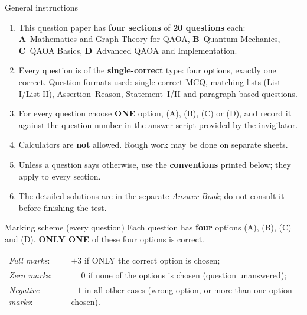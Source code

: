 \documentclass[11pt,a4paper]{article}
\begin{document}
\vspace{6pt}
\begin{infobox}{General instructions}
\begin{enumerate}[leftmargin=1.4em, itemsep=1pt, topsep=1pt]
\item This question paper has \textbf{four sections} of \textbf{20 questions} each:
\textbf{A}~Mathematics and Graph Theory for QAOA, \textbf{B}~Quantum Mechanics, \textbf{C}~QAOA Basics, \textbf{D}~Advanced QAOA and Implementation.
\item Every question is of the \textbf{single-correct} type: four options, exactly one correct. Question formats used:
single-correct MCQ, matching lists (List-I/List-II), Assertion--Reason, Statement~I/II and paragraph-based questions.
\item For every question choose \textbf{ONE} option, (A), (B), (C) or (D), and record it against the question number in the answer script provided by the invigilator.
\item Calculators are \textbf{not} allowed. Rough work may be done on separate sheets.
\item Unless a question says otherwise, use the \textbf{conventions} printed below; they apply to every section.
\item The detailed solutions are in the separate \emph{Answer Book}; do not consult it before finishing the test.
\end{enumerate}
\end{infobox}
\begin{infobox}{Marking scheme (every question)}
Each question has \textbf{four} options (A), (B), (C) and (D). \textbf{ONLY ONE} of these four options is correct.\\[2pt]
\begin{tabular}{@{}ll@{}}
\emph{Full marks}: & $+3$ if ONLY the correct option is chosen;\\
\emph{Zero marks}: & $\phantom{+}0$ if none of the options is chosen (question unanswered);\\
\emph{Negative marks}: & $-1$ in all other cases (wrong option, or more than one option chosen).
\end{tabular}
\end{infobox}
\end{document}
